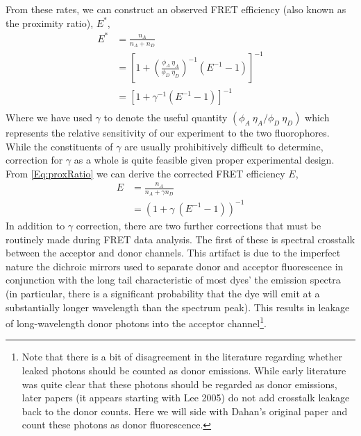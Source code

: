\documentclass{article}
\begin{document}
From these rates, we can construct an observed FRET efficiency (also
known as the proximity ratio), $E^*$,
\begin{align*}
  E^* & = \frac{n_A}{n_A + n_D} \\
      & = \left[ 1 + \left(\frac{\phi_A~\eta_A}{\phi_D~\eta_D}\right)^{-1} (E^{-1} - 1) \right]^{-1} \\
      & = \left[ 1 + \gamma^{-1} (E^{-1} - 1) \right]^{-1} \\ \label{Eq:proxRatio}
\end{align*}
Where we have used $\gamma$ to denote the useful quantity $(\phi_A~\eta_A / \phi_D~\eta_D)$
which represents the relative sensitivity of our experiment to the two
fluorophores. While the constituents of $\gamma$ are usually
prohibitively difficult to determine, correction for $\gamma$ as a
whole is quite feasible given proper experimental design. From
\eqref{Eq:proxRatio} we can derive the corrected FRET efficiency $E$,
\begin{align}
  E & = \frac{n_A}{n_A + \gamma n_D} \\
  & = \left( 1 + \gamma ~ (E^{-1} - 1) \right)^{-1} \label{Eq:gammaFretEff}
\end{align}
In addition to $\gamma$ correction, there are two further corrections that
must be routinely made during FRET data analysis. The first of these
is spectral crosstalk between the acceptor and donor channels. This
artifact is due to the imperfect nature the dichroic mirrors
used to separate donor and acceptor fluorescence in conjunction with
the long tail characteristic of most dyes' the emission spectra (in
particular, there is a significant probability that the dye will emit
at a substantially longer wavelength than the spectrum peak).  This
results in leakage of long-wavelength donor photons into the acceptor
channel\footnote{Note that there is a bit of disagreement in the
literature regarding whether leaked photons should be counted as donor
emissions. While early literature\cite{Dahan2005,Taylor2010} was quite
clear that these photons should be regarded as donor emissions, later
papers (it appears starting with Lee 2005\cite{Lee2005}) do not add
crosstalk leakage back to the donor counts. Here we will side with
Dahan's original paper and count these photons as donor fluorescence.}.
\end{document}
